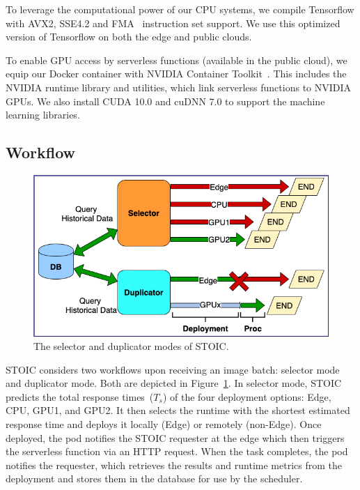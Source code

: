 To leverage the computational power of our CPU systems, we compile Tensorflow with AVX2, SSE4.2 \cite{ref:avx} and FMA~\cite{ref:fma} instruction set support. We use this optimized version of Tensorflow on both the edge and public clouds.
 
To enable GPU access by serverless functions (available in the public cloud), we equip our Docker container with NVIDIA Container Toolkit~\cite{ref:nvidia}. This includes the NVIDIA runtime library and utilities, which link serverless functions to NVIDIA GPUs. We also install CUDA 10.0 and cuDNN 7.0 to support the machine learning libraries.
 
 
 \subsection{Workflow}

\begin{figure}[t] \centering 
\includegraphics[scale=0.5]{figures/selector_duplicator.png}
\caption{The selector and duplicator modes of STOIC. 
\label{fig:duplicator}}
\end{figure}


STOIC considers two workflows upon receiving an image batch: 
selector mode and duplicator mode. Both are depicted in Figure~\ref{fig:duplicator}. In selector mode, STOIC predicts the total response times~($T_s$) of the four deployment options: Edge, CPU, GPU1, and GPU2.  It then selects the runtime with the shortest estimated response time and deploys it locally (Edge) or remotely (non-Edge). Once deployed, the pod notifies the STOIC requester at the edge which then triggers the serverless function via an HTTP request. When the task completes, the pod notifies the requester, which retrieves the results and runtime metrics from the deployment and stores them in the database for use by the scheduler.

